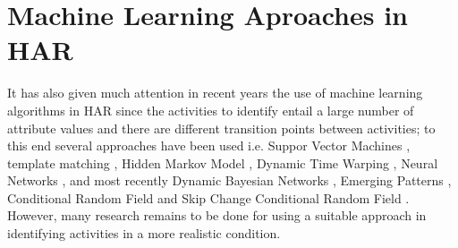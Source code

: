 \section{Machine Learning Aproaches in HAR}

It has also given much attention in recent years 
the use of machine learning algorithms in HAR
since the activities to identify entail a large number of attribute values
and there are different transition points between activities;
to this end several approaches have been used i.e. 
Suppor Vector Machines \cite{J.FrankS.Mannor2010, Sama2013, Schuldt2004},
template matching \cite{Nguyen2009,Lin2007}, 
Hidden Markov Model 
\cite{Kohn2012,Niu2004,Chen2003,Bernardin2003,
Eickeler1998,Chang2000},
Dynamic Time Warping \cite{Bautista2013,Boulgouris2004,Celebi2011},
Neural Networks \cite{Rosenblum1994,Ji2013,Modi2011,Boesnach2004},
and  most recently 
Dynamic Bayesian Networks \cite{Cuaya2013, Wang2014}, 
Emerging Patterns \cite{Tao2009, Kim2010},
Conditional Random Field  \cite{Wang2006} and
Skip Change Conditional Random Field \cite{Kim2010}. 
However, many research remains to be done for 
using a suitable approach in identifying activities in a more realistic condition.



